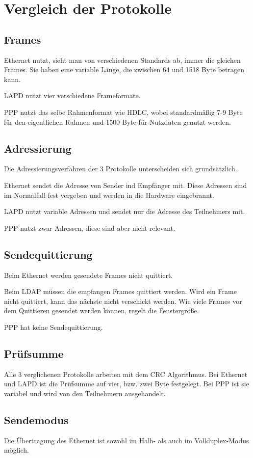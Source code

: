 \documentclass[12pt, a4paper, ngerman]{article}
\begin{document}
\section{Vergleich der Protokolle}
\subsection{Frames}
Ethernet nutzt, sieht man von verschiedenen Standards ab, immer die gleichen Frames. Sie haben eine variable Länge, die zwischen 64 und 1518 Byte betragen kann.

LAPD nutzt vier verschiedene Frameformate. 

PPP nutzt das selbe Rahmenformat wie HDLC, wobei standardmäßig 7-9 Byte für den eigentlichen Rahmen und 1500 Byte für Nutzdaten genutzt werden.
\subsection{Adressierung}
Die Adressierungsverfahren der 3 Protokolle unterscheiden sich grundsätzlich. 

Ethernet sendet die Adresse von Sender ind Empfänger mit. Diese Adressen sind im Normalfall fest vergeben und werden in die Hardware eingebrannt.

LAPD nutzt variable Adressen und sendet nur die Adresse des Teilnehmers mit.

PPP nutzt zwar Adressen, diese sind aber nicht relevant.

\subsection{Sendequittierung}
Beim Ethernet werden gesendete Frames nicht quittiert. 

Beim LDAP müssen die empfangen Frames quittiert werden. Wird ein Frame nicht quittiert, kann das nächste nicht verschickt werden. Wie viele Frames vor dem Quittieren gesendet werden können, regelt die Fenstergröße.

PPP hat keine Sendequittierung.

\subsection{Prüfsumme} 
Alle 3 verglichenen Protokolle arbeiten mit dem CRC Algorithmus. Bei Ethernet und LAPD ist die Prüfsumme auf vier, bzw. zwei Byte festgelegt. Bei PPP ist sie variabel und wird von den Teilnehmern ausgehandelt. 

\subsection{Sendemodus}
Die Übertragung des Ethernet ist sowohl im Halb- als auch im Vollduplex-Modus möglich. 
\end{document}
